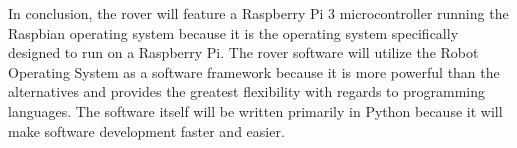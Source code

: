 \documentclass[onecolumn, draftclsnofoot,10pt, compsoc]{IEEEtran}
\begin{document}
In conclusion, the rover will feature a Raspberry Pi 3 microcontroller running the Raspbian operating system because it is the operating system specifically designed to run on a Raspberry Pi. The rover software will utilize the Robot Operating System as a software framework because it is more powerful than the alternatives and provides the greatest flexibility with regards to programming languages. The software itself will be written primarily in Python because it will make software development faster and easier. 
\clearpage


\end{document}
